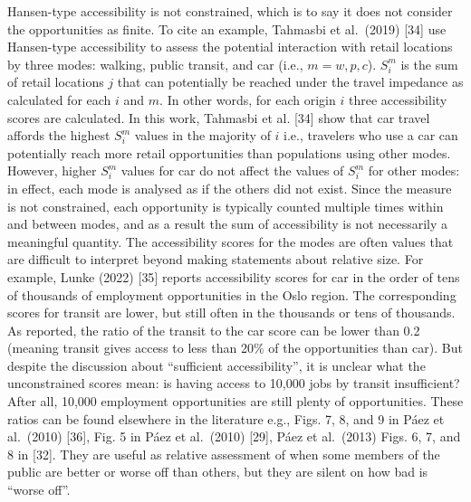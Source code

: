 \documentclass[10pt,letterpaper]{article}
\begin{document}
Hansen-type accessibility is not constrained, which is to say it does
not consider the opportunities as finite. To cite an example, Tahmasbi
et al.~(2019) {[}34{]} use Hansen-type accessibility to assess the
potential interaction with retail locations by three modes: walking,
public transit, and car (i.e., \(m = w, p, c\)). \(S_i^m\) is the sum of
retail locations \(j\) that can potentially be reached under the travel
impedance as calculated for each \(i\) and \(m\). In other words, for
each origin \(i\) three accessibility scores are calculated. In this
work, Tahmasbi et al. {[}34{]} show that car travel affords the highest
\(S_i^{m}\) values in the majority of \(i\) i.e., travelers who use a
car can potentially reach more retail opportunities than populations
using other modes. However, higher \(S_i^{m}\) values for car do not
affect the values of \(S_i^{m}\) for other modes: in effect, each mode
is analysed as if the others did not exist. Since the measure is not
constrained, each opportunity is typically counted multiple times within
and between modes, and as a result the sum of accessibility is not
necessarily a meaningful quantity. The accessibility scores for the
modes are often values that are difficult to interpret beyond making
statements about relative size. For example, Lunke (2022) {[}35{]}
reports accessibility scores for car in the order of tens of thousands
of employment opportunities in the Oslo region. The corresponding scores
for transit are lower, but still often in the thousands or tens of
thousands. As reported, the ratio of the transit to the car score can be
lower than 0.2 (meaning transit gives access to less than 20\% of the
opportunities than car). But despite the discussion about ``sufficient
accessibility'', it is unclear what the unconstrained scores mean: is
having access to 10,000 jobs by transit insufficient? After all, 10,000
employment opportunities are still plenty of opportunities. These ratios
can be found elsewhere in the literature e.g., Figs. 7, 8, and 9 in Páez
et al.~(2010) {[}36{]}, Fig. 5 in Páez et al.~(2010) {[}29{]}, Páez et
al.~(2013) Figs. 6, 7, and 8 in {[}32{]}. They are useful as relative
assessment of when some members of the public are better or worse off
than others, but they are silent on how bad is ``worse off''.
\end{document}

